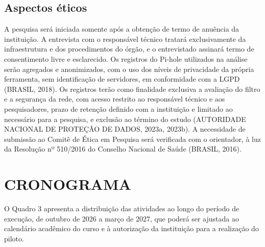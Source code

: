 \documentclass[12pt,a4paper]{article}
\begin{document}
\subsection{Aspectos éticos}
A pesquisa será iniciada somente após a obtenção de termo de anuência da instituição. A entrevista com o responsável técnico tratará exclusivamente da infraestrutura e dos procedimentos do órgão, e o entrevistado assinará termo de consentimento livre e esclarecido. Os registros do Pi-hole utilizados na análise serão agregados e anonimizados, com o uso dos níveis de privacidade da própria ferramenta, sem identificação de servidores, em conformidade com a LGPD (BRASIL, 2018). Os registros terão como finalidade exclusiva a avaliação do filtro e a segurança da rede, com acesso restrito ao responsável técnico e aos pesquisadores, prazo de retenção definido com a instituição e limitado ao necessário para a pesquisa, e exclusão ao término do estudo (AUTORIDADE NACIONAL DE PROTEÇÃO DE DADOS, 2023a, 2023b). A necessidade de submissão ao Comitê de Ética em Pesquisa será verificada com o orientador, à luz da Resolução nº 510/2016 do Conselho Nacional de Saúde (BRASIL, 2016).

\clearpage
\section{CRONOGRAMA}
O Quadro 3 apresenta a distribuição das atividades ao longo do período de execução, de outubro de 2026 a março de 2027, que poderá ser ajustada ao calendário acadêmico do curso e à autorização da instituição para a realização do piloto.
\end{document}

